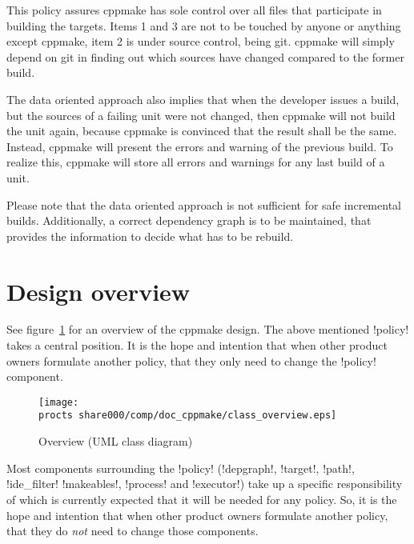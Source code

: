 This policy assures cppmake has sole control over all files that participate in
building the targets. Items 1 and 3 are not to be touched by anyone or anything
except cppmake, item 2 is under source control, being git. cppmake will simply
depend on git in finding out which sources have changed compared to the former
build.

The data oriented approach also implies that when the developer issues a build,
but the sources of a failing unit were not changed, then cppmake will not build
the unit again, because cppmake is convinced that the result shall be the same.
Instead, cppmake will present the errors and warning of the previous build.
To realize this, cppmake will store all errors and warnings for any last build
of a unit.

Please note that the data oriented approach is not sufficient for safe incremental
builds. Additionally, a correct dependency graph is to be maintained, that provides
the information to decide what has to be rebuild.

\section{Design overview}
\label{sec:share000.cppmake.design_overview}

See figure~\ref{fig:share000.cppmake.overview} for an overview of the cppmake
design. The above mentioned !policy! takes a central position. It is the hope and
intention that when other product owners formulate another policy, that they only
need to change the !policy! component.

\begin{figure}[tbh]
    \begin{center}
        \texttt{[image: \\procts share000/comp/doc\_cppmake/class\_overview.eps]}
    \end{center}
    \caption{Overview (UML class diagram) }
	\label{fig:share000.cppmake.overview}
\end{figure}

Most components surrounding the !policy! (!depgraph!, !target!, !path!, !ide_filter!
!makeables!, !process! and !executor!) take up a specific responsibility of which
is currently expected that it will be needed for any policy. So, it is the hope and
intention that when other product owners formulate another policy, that they do
{\em not} need to change those components.

